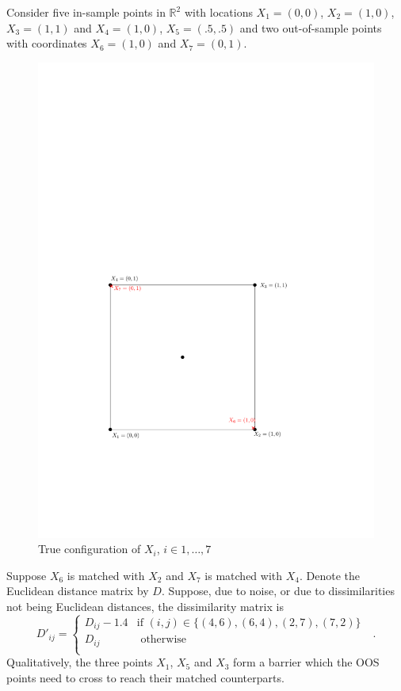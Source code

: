 \documentclass[11pt]{article} %
\begin{document}
Consider five in-sample points in $\mathbb{R}^2$ with locations $X_1=(0,0)$, $X_2=(1,0)$, $X_3=(1,1)$
 and $X_4=(1,0)$, $X_5=(.5,.5)$ and two out-of-sample  points with coordinates $X_6=(1,0)$ and $X_7=(0,1)$.
 \begin{figure}
 \centering
 \includegraphics[scale=0.35]{multmin-diag}
 \caption{True configuration of $X_{i}$, $i \in {1,\ldots,7}$}
\label{original-config}
 \end{figure} 
  Suppose $X_6$ is matched with $X_2$ and $X_7$ is matched with $X_4$. 
  Denote the Euclidean distance matrix by $D$. 
  Suppose, due to noise, or due to dissimilarities not being Euclidean distances, 
  the dissimilarity matrix is $$D'_{ij}=\begin{cases}
  D_{ij}-1.4 & \textrm{if  $(i,j) \in \{(4,6),(6,4),(2,7),(7,2)   \}$ }\\
  D_{ij}  & \textrm{ otherwise}\\
  \end{cases}.$$ 
Qualitatively, the three points $X_1$, $X_5$ and $X_3$ form a barrier which the OOS points need to cross  to reach their matched counterparts. 
\end{document}
